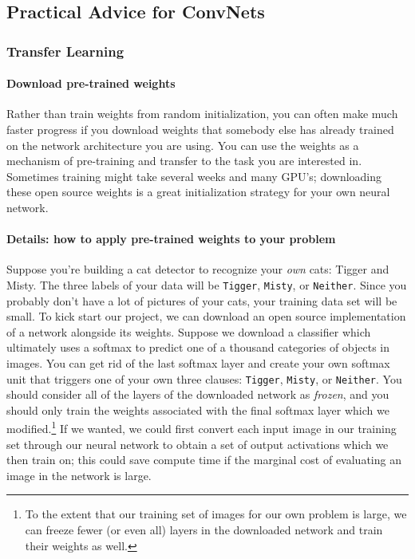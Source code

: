 \documentclass[12pt]{article}
\begin{document}
\subsection{Practical Advice for ConvNets}
\subsubsection{Transfer Learning}
\paragraph{Download pre-trained weights}
Rather than train weights from random initialization, you can often make much faster progress if you download weights that somebody else has already trained on the network architecture you are using. You can use the weights as a mechanism of pre-training and transfer to the task you are interested in. Sometimes training might take several weeks and many GPU's; downloading these open source weights is a great initialization strategy for your own neural network.

\paragraph{Details: how to apply pre-trained weights to your problem}
Suppose you're building a cat detector to recognize your \emph{own} cats: Tigger and Misty. The three labels of your data will be \texttt{Tigger}, \texttt{Misty}, or \texttt{Neither}. Since you probably don't have a lot of pictures of your cats, your training data set will be small. To kick start our project, we can download an open source implementation of a network alongside its weights. Suppose we download a classifier which ultimately uses a softmax to predict one of a thousand categories of objects in images. You can get rid of the last softmax layer and create your own softmax unit that triggers one of your own three clauses: \texttt{Tigger}, \texttt{Misty}, or \texttt{Neither}. You should consider all of the layers of the downloaded network as \emph{frozen}, and you should only train the weights associated with the final softmax layer which we modified.\footnote{To the extent that our training set of images for our own problem is large, we can freeze fewer (or even all) layers in the downloaded network and train their weights as well.} If we wanted, we could first convert each input image in our training set through our neural network to obtain a set of output activations which we then train on; this could save compute time if the marginal cost of evaluating an image in the network is large.
\end{document}
